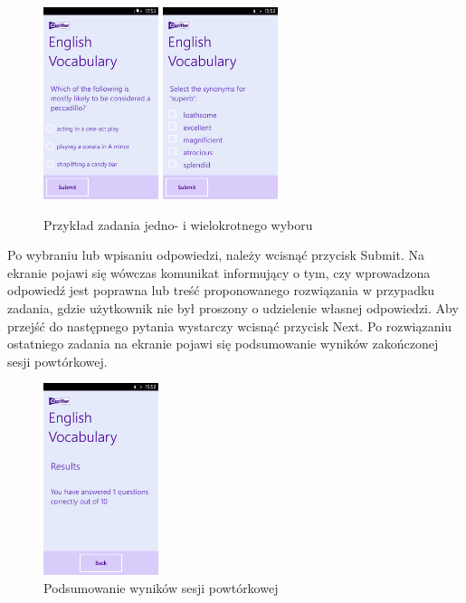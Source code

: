 \documentclass{pracamgr}
\begin{document}
\begin{figure}[h]
    \centering
    \includegraphics[width=0.3\textwidth]{Single_choice.png}
    \hspace{10.00mm}
    \includegraphics[width=0.3\textwidth]{Multiple_choice.png}
    \caption{Przykład zadania jedno- i wielokrotnego wyboru}
    \label{fig:exercise}
\end{figure}

Po wybraniu lub wpisaniu odpowiedzi, należy wcisnąć przycisk Submit. Na ekranie pojawi się wówczas komunikat informujący o tym, czy wprowadzona odpowiedź jest poprawna lub treść proponowanego rozwiązania w przypadku zadania, gdzie użytkownik nie był proszony o udzielenie własnej odpowiedzi. Aby przejść do następnego pytania wystarczy wcisnąć przycisk Next. Po rozwiązaniu ostatniego zadania na ekranie pojawi się podsumowanie wyników zakończonej sesji powtórkowej.

\begin{figure}[h]
    \centering
    \includegraphics[width=0.3\textwidth]{Results.png}
    \caption{Podsumowanie wyników sesji powtórkowej}
    \label{fig:results}
\end{figure}
\end{document}
